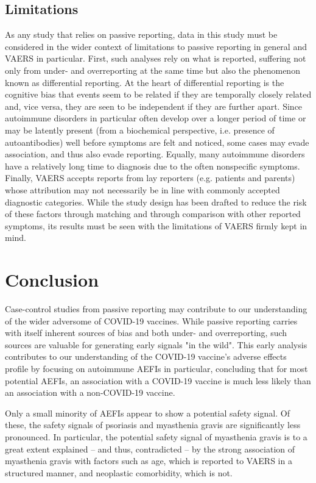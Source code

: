 \documentclass{article}
\begin{document}
\subsection{Limitations}

As any study that relies on passive reporting, data in this study must be considered in the wider context of limitations to passive reporting in general and VAERS in particular.
First, such analyses rely on what is reported, suffering not only from under- and overreporting at the same time but also the phenomenon known as differential reporting.\cite{rosenthal1995reporting}
At the heart of differential reporting is the cognitive bias that events seem to be related if they are temporally closely related and, vice versa, they are seen to be independent if they are further apart.
Since autoimmune disorders in particular often develop over a longer period of time or may be latently present (from a biochemical perspective, i.e. presence of autoantibodies) well before symptoms are felt and noticed, some cases may evade association, and thus also evade reporting.
Equally, many autoimmune disorders have a relatively long time to diagnosis due to the often nonspecific symptoms.
Finally, VAERS accepts reports from lay reporters (e.g. patients and parents) whose attribution may not necessarily be in line with commonly accepted diagnostic categories.
While the study design has been drafted to reduce the risk of these factors through matching and through comparison with other reported symptoms, its results must be seen with the limitations of VAERS firmly kept in mind.

\section{Conclusion}

Case-control studies from passive reporting may contribute to our understanding of the wider adversome of COVID-19 vaccines.
While passive reporting carries with itself inherent sources of bias and both under- and overreporting, such sources are valuable for generating early signals "in the wild".
This early analysis contributes to our understanding of the COVID-19 vaccine's adverse effects profile by focusing on autoimmune AEFIs in particular, concluding that for most potential AEFIs, an association with a COVID-19 vaccine is much less likely than an association with a non-COVID-19 vaccine.

Only a small minority of AEFIs appear to show a potential safety signal.
Of these, the safety signals of psoriasis and myasthenia gravis are significantly less pronounced.
In particular, the potential safety signal of myasthenia gravis is to a great extent explained -- and thus, contradicted -- by the strong association of myasthenia gravis with factors such as age, which is reported to VAERS in a structured manner, and neoplastic comorbidity, which is not.
\end{document}
